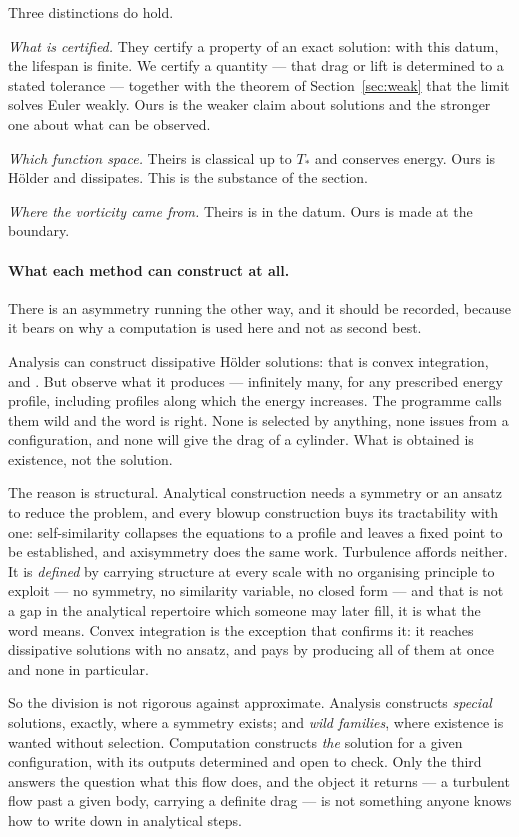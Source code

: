 \documentclass[11pt]{article}
\begin{document}
Three distinctions do hold.

\emph{What is certified.} They certify a property of an exact solution: with this datum, the
lifespan is finite. We certify a quantity --- that drag or lift is determined to a stated tolerance
--- together with the theorem of Section~\ref{sec:weak} that the limit solves Euler weakly. Ours is
the weaker claim about solutions and the stronger one about what can be observed.

\emph{Which function space.} Theirs is classical up to $T_*$ and conserves energy. Ours is
H\"older and dissipates. This is the substance of the section.

\emph{Where the vorticity came from.} Theirs is in the datum. Ours is made at the boundary.

\paragraph{What each method can construct at all.} There is an asymmetry running the other way,
and it should be recorded, because it bears on why a computation is used here and not as second best.

Analysis can construct dissipative H\"older solutions: that is convex integration, and
\cite{dls,bdlis,isett}. But observe what it produces --- infinitely many, for any prescribed energy
profile, including profiles along which the energy increases. The programme calls them wild and the
word is right. None is selected by anything, none issues from a configuration, and none will give
the drag of a cylinder. What is obtained is existence, not the solution.

The reason is structural. Analytical construction needs a symmetry or an ansatz to reduce the
problem, and every blowup construction buys its tractability with one: self-similarity collapses the
equations to a profile and leaves a fixed point to be established, and axisymmetry does the same
work. Turbulence affords neither. It is \emph{defined} by carrying structure at every scale with no
organising principle to exploit --- no symmetry, no similarity variable, no closed form --- and that
is not a gap in the analytical repertoire which someone may later fill, it is what the word means.
Convex integration is the exception that confirms it: it reaches dissipative solutions with no
ansatz, and pays by producing all of them at once and none in particular.

So the division is not rigorous against approximate. Analysis constructs \emph{special} solutions,
exactly, where a symmetry exists; and \emph{wild families}, where existence is wanted without
selection. Computation constructs \emph{the} solution for a given configuration, with its outputs
determined and open to check. Only the third answers the question what this flow does, and the
object it returns --- a turbulent flow past a given body, carrying a definite drag --- is not
something anyone knows how to write down in analytical steps.
\end{document}
